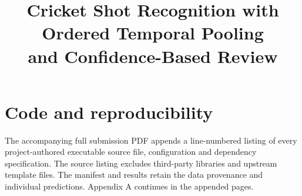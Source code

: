 \documentclass[10pt,twocolumn,letterpaper]{article}
\begin{document}
\title{Cricket Shot Recognition with Ordered Temporal Pooling\\and Confidence-Based Review}

\maketitle

{\small


}
\clearpage
\appendix
\section{Code and reproducibility}
The accompanying full submission PDF appends a line-numbered listing of every project-authored executable source file, configuration and dependency specification. The source listing excludes third-party libraries and upstream template files. The manifest and results retain the data provenance and individual predictions. Appendix A continues in the appended pages.

\end{document}
